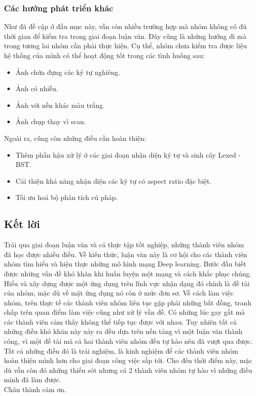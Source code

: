 \documentclass[a4paper,12pt]{article}
\begin{document}
	\subsubsection{Các hướng phát triển khác}
	Như đã đề cập ở đầu mục này, vẫn còn nhiều trường hợp mà nhóm không có đủ thời gian để kiểm tra trong giai đoạn luận văn. Đây cũng là những hướng đi mà trong tương lai nhóm cần phải thực hiện. Cụ thể, nhóm chưa kiểm tra được liệu hệ thống của mình có thể hoạt động tốt trong các tình huống sau:
	\begin{itemize}
		\item Ảnh chứa đựng các ký tự nghiêng.
		\item Ảnh có nhiễu.
		\item Ảnh với nền khác màu trắng.
		\item Ảnh chụp thay vì scan.
		
	\end{itemize}
	\vspace{1cm}
	Ngoài ra, cũng còn những điều cần hoàn thiện:
	\begin{itemize}
		\item Thêm phần hậu xử lý ở các giai đoạn nhận diện ký tự và sinh cây Lexed - BST.
		\item Cải thiện khả năng nhận diện các ký tự có aspect ratio đặc biệt.
		\item Tối ưu hoá bộ phân tích cú pháp. 
	\end{itemize}
	
	\newpage
	\subsection*{Kết lời}
	Trải qua giai đoạn luận văn và cả thực tập tốt nghiệp, những thành viên nhóm đã học được nhiều điều. Về kiến thức, luận văn này là cơ hội cho các thành viên nhóm tìm hiểu và hiện thực những mô hình mạng Deep learning. Bước đầu biết được những vấn đề khó khăn khi huấn luyện một mạng và cách khắc phục chúng. Hiểu và xây dựng được một ứng dụng trên lĩnh vực nhận dạng đó chính là đề tài của nhóm, mặc dù về mặt ứng dụng nó còn ở mức đơn sơ. Về cách làm việc nhóm, trên thực tế các thành viên nhóm liên tục gặp phải những bất đồng, tranh chấp trên quan điểm làm việc cũng như xử lý vần đề. Có những lúc gay gắt mà các thành viên cảm thấy không thể tiếp tục được với nhau. Tuy nhiên tất cả những điều khó khăn này xảy ra đều dựa trên nền tảng vì một luận văn thành công, vì một đề tài mà cả hai thành viên nhóm đều tự hào nên đã vượt qua được. Tất cả những điều đó là trải nghiệm, là kinh nghiệm để các thành viên nhóm hoàn thiện mình hơn cho giai đoạn công việc sắp tới. Cho đến thời điểm này, mặc dù vẫn còn đó những thiếu sót nhưng cả 2 thành viên nhóm tự hào vì những điều mình đã làm được. \\
	Chân thành cảm ơn. 
	
	\newpage
	
	
\end{document}
